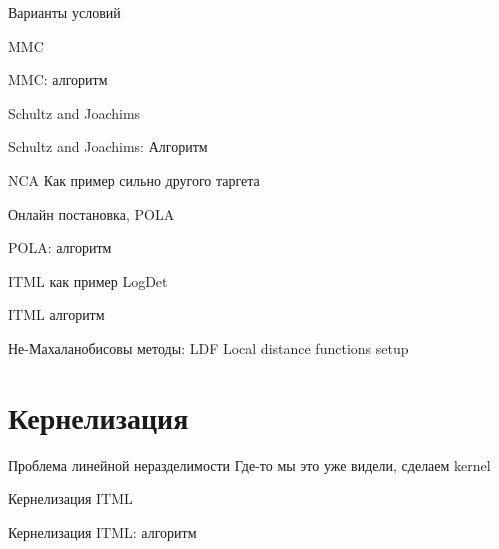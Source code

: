 \documentclass[14pt, fleqn, xcolor={dvipsnames, table}]{beamer}
\begin{document}
\begin{frame}{Варианты условий}

\end{frame}

\begin{frame}{MMC}
\end{frame}


\begin{frame}{MMC: алгоритм}
\end{frame}


\begin{frame}{Schultz and Joachims}
\end{frame}

\begin{frame}{Schultz and Joachims: Алгоритм}
\end{frame}

\begin{frame}{NCA}
Как пример сильно другого таргета
\end{frame}

\begin{frame}{Онлайн постановка, POLA}
\end{frame}

\begin{frame}{POLA: алгоритм}
\end{frame}


\begin{frame}{ITML как пример LogDet}
\end{frame}

\begin{frame}{ITML алгоритм}
\end{frame}

\begin{frame}{Не-Махаланобисовы методы: LDF}
Local distance functions setup
\end{frame}

\section{Кернелизация}
\begin{frame}{Проблема линейной неразделимости}
Где-то мы это уже видели, сделаем kernel
\end{frame}

\begin{frame}{Кернелизация ITML}
\end{frame}

\begin{frame}{Кернелизация ITML: алгоритм}
\end{frame}
\end{document}
